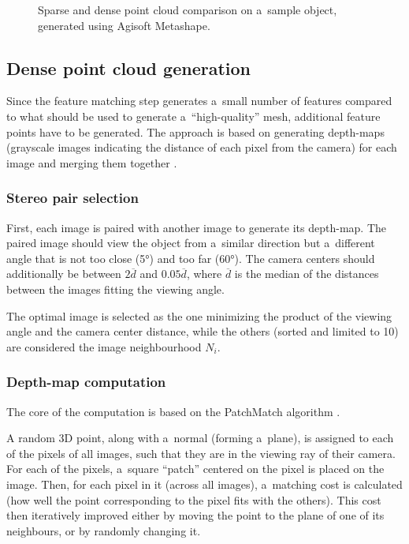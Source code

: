 \begin{figure}[h]
	\centering
	\hfill
	\caption{Sparse and dense point cloud comparison on a~sample object, generated using Agisoft Metashape.}%
\end{figure}

\subsection{Dense point cloud generation}
Since the feature matching step generates a~small number of features compared to what should be used to generate a~``high-quality'' mesh, additional feature points have to be generated.
The approach is based on generating depth-maps (grayscale images indicating the distance of each pixel from the camera) for each image and merging them together \cite{shen2013accurate}.

\subsubsection{Stereo pair selection}
First, each image is paired with another image to generate its depth-map.
The paired image should view the object from a~similar direction but a~different angle that is not too close (\ang{5}) and too far (\ang{60}).
The camera centers should additionally be between $2 \overline{d}$ and $0.05 \overline{d}$, where $\overline{d}$ is the median of the distances between the images fitting the viewing angle.

The optimal image is selected as the one minimizing the product of the viewing angle and the camera center distance, while the others (sorted and limited to 10) are considered the image neighbourhood $N_i$.

\subsubsection{Depth-map computation}
The core of the computation is based on the PatchMatch algorithm \cite{barnes2009PAR}.

A random 3D point, along with a~normal (forming a~plane), is assigned to each of the pixels of all images, such that they are in the viewing ray of their camera.
For each of the pixels, a~square ``patch'' centered on the pixel is placed on the image.
Then, for each pixel in it (across all images), a~matching cost is calculated (how well the point corresponding to the pixel fits with the others).
This cost then iteratively improved either by moving the point to the plane of one of its neighbours, or by randomly changing it.

